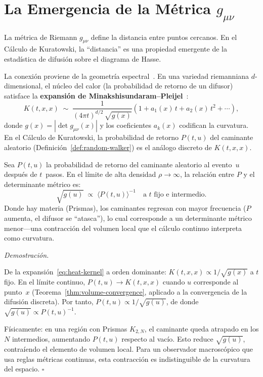 \documentclass[11pt, a4paper, openany]{book}
\renewenvironment{proof}[1][Demostraci\'on]{%
  \par\noindent\textit{#1.}\quad
}{\hfill$\square$\par\medskip}
\begin{document}
\section{La Emergencia de la M\'etrica $g_{\mu\nu}$}

La m\'etrica de Riemann $g_{\mu\nu}$ define la distancia entre puntos
cercanos. En el C\'alculo de Kuratowski, la ``distancia'' es una
propiedad emergente de la estad\'istica de difusi\'on sobre el
diagrama de Hasse.

La conexi\'on proviene de la geometr\'ia
espectral~\cite{gilkey1975,berger2003}. En una variedad riemanniana
$d$-dimensional, el n\'ucleo del calor (la probabilidad de retorno de
un difusor) satisface la \textbf{expansi\'on de
Minakshisundaram--Pleijel}~\cite{minakshisundaram1949}:
\begin{equation}
  K(t, x, x)
  \;\sim\;
  \frac{1}{(4\pi t)^{d/2}\,\sqrt{g(x)}}
  \left(1 + a_1(x)\,t + a_2(x)\,t^2 + \cdots\right),
  \label{eq:heat-kernel}
\end{equation}
donde $g(x) = |\det g_{\mu\nu}(x)|$ y los coeficientes $a_k(x)$
codifican la curvatura. En el C\'alculo de Kuratowski, la
probabilidad de retorno $P(t, u)$ del caminante aleatorio
(Definici\'on~\ref{def:random-walker}) es el an\'alogo discreto de
$K(t, x, x)$.

\begin{theorem}
\label{thm:emergent-metric}
Sea $P(t, u)$ la probabilidad de retorno del caminante aleatorio al
evento~$u$ despu\'es de $t$~pasos. En el l\'imite de alta densidad
$\rho \to \infty$, la relaci\'on entre $P$ y el determinante
m\'etrico es:
\begin{equation}
  \boxed{\;
  \sqrt{g(u)}
  \;\propto\;
  \bigl\langle P(t, u) \bigr\rangle^{-1}
  \quad\text{a $t$ fijo e intermedio.}
  \;}
  \label{eq:metric-from-return}
\end{equation}
Donde hay materia (Prismas), los caminantes regresan con mayor
frecuencia ($P$ aumenta, el difusor se ``atasca''), lo cual
corresponde a un determinante m\'etrico menor---una contracci\'on
del volumen local que el c\'alculo continuo interpreta como
curvatura.
\end{theorem}

\begin{proof}
De la expansi\'on~\eqref{eq:heat-kernel} a orden dominante:
$K(t, x, x) \propto 1/\sqrt{g(x)}$ a $t$ fijo. En el l\'imite
continuo, $P(t, u) \to K(t, x, x)$ cuando $u$ corresponde al
punto~$x$ (Teorema~\ref{thm:volume-convergence}, aplicado a la
convergencia de la difusi\'on discreta). Por tanto,
$P(t, u) \propto 1/\sqrt{g(u)}$, de donde
$\sqrt{g(u)} \propto P(t, u)^{-1}$.

F\'isicamente: en una regi\'on con Prismas $K_{2,N}$, el caminante
queda atrapado en los $N$ intermedios, aumentando $P(t,u)$ respecto
al vac\'io. Esto reduce $\sqrt{g(u)}$, contra\'iendo el elemento de
volumen local. Para un observador macrosc\'opico que usa reglas
m\'etricas continuas, esta contracci\'on es indistinguible de la
curvatura del espacio.
\end{proof}
\end{document}
